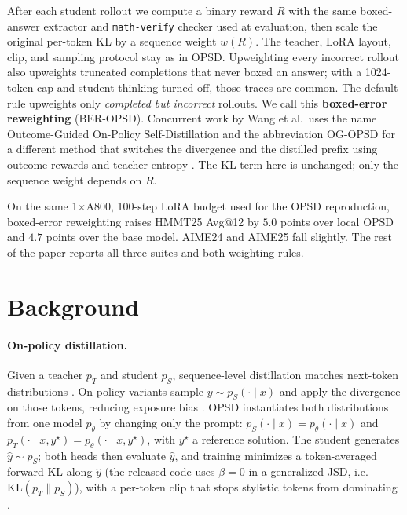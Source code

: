 \documentclass[letterpaper]{article}
\begin{document}
After each student rollout we compute a binary reward $R$ with the same boxed-answer extractor and \texttt{math-verify} checker used at evaluation, then scale the original per-token KL by a sequence weight $w(R)$. The teacher, LoRA layout, clip, and sampling protocol stay as in OPSD. Upweighting every incorrect rollout also upweights truncated completions that never boxed an answer; with a 1024-token cap and student thinking turned off, those traces are common. The default rule upweights only \emph{completed but incorrect} rollouts. We call this \textbf{boxed-error reweighting} (BER-OPSD). Concurrent work by Wang et al.\ uses the name Outcome-Guided On-Policy Self-Distillation and the abbreviation OG-OPSD for a different method that switches the divergence and the distilled prefix using outcome rewards and teacher entropy \cite{wang2026ogopsd}. The KL term here is unchanged; only the sequence weight depends on $R$.

On the same 1$\times$A800, 100-step LoRA budget used for the OPSD reproduction, boxed-error reweighting raises HMMT25 Avg@12 by $5.0$ points over local OPSD and $4.7$ points over the base model. AIME24 and AIME25 fall slightly. The rest of the paper reports all three suites and both weighting rules.

\section{Background}

\paragraph{On-policy distillation.}
Given a teacher $p_T$ and student $p_S$, sequence-level distillation matches next-token distributions \cite{kim2016sequencekd,gu2024minillm}. On-policy variants sample $y \sim p_S(\cdot\mid x)$ and apply the divergence on those tokens, reducing exposure bias \cite{agarwal2024gkd}. OPSD instantiates both distributions from one model $p_\theta$ by changing only the prompt: $p_S(\cdot\mid x)=p_\theta(\cdot\mid x)$ and $p_T(\cdot\mid x,y^\star)=p_\theta(\cdot\mid x,y^\star)$, with $y^\star$ a reference solution. The student generates $\hat y\sim p_S$; both heads then evaluate $\hat y$, and training minimizes a token-averaged forward KL along $\hat y$ (the released code uses $\beta{=}0$ in a generalized JSD, i.e.\ $\mathrm{KL}(p_T\|p_S)$), with a per-token clip that stops stylistic tokens from dominating \cite{zhao2026opsd}.
\end{document}
